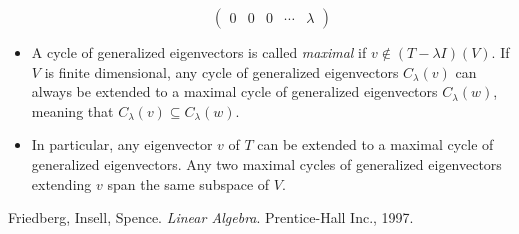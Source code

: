 \documentclass[12pt]{article}
\begin{document}
\begin{itemize}
$$\begin{pmatrix}
0 & 0 & 0 & \cdots & \lambda
\end{pmatrix}$$
\item
A cycle of generalized eigenvectors is called \emph{maximal} if $v\notin (T-\lambda I)(V)$.  If $V$ is finite dimensional, any cycle of generalized eigenvectors $C_{\lambda}(v)$ can always be extended to a maximal cycle of generalized eigenvectors $C_{\lambda}(w)$, meaning that $C_{\lambda}(v)\subseteq C_{\lambda}(w)$.  
\item
In particular, any eigenvector $v$ of $T$ can be extended to a maximal cycle of generalized eigenvectors.  Any two maximal cycles of generalized eigenvectors extending $v$ span the same subspace of $V$.
\end{itemize}

\begin{thebibliography}{3}
 Friedberg, Insell, Spence. {\it Linear Algebra}. Prentice-Hall Inc., 1997.
\end{thebibliography}
\end{document}
